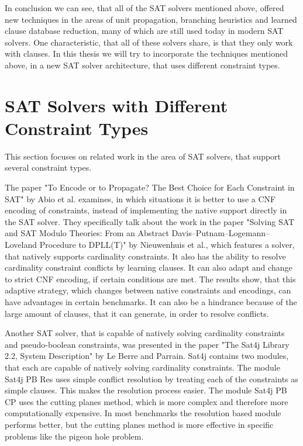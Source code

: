 In conclusion we can see, that all of the SAT solvers mentioned above, offered new techniques in the areas of unit propagation, branching heuristics and learned clause database reduction, many of which are still used today in modern SAT solvers. One characteristic, that all of these solvers share, is that they only work with clauses. In this thesis we will try to incorporate the techniques mentioned above, in a new SAT solver architecture, that uses different constraint types.

\section{SAT Solvers with Different Constraint Types}
This section focuses on related work in the area of SAT solvers, that support several constraint types.

The paper "To Encode or to Propagate? The Best Choice for Each Constraint in SAT" \cite{abio2013encode} by Abio et al. examines, in which situations it is better to use a CNF encoding of constraints, instead of implementing the native support directly in the SAT solver. They specifically talk about the work in the paper "Solving SAT and SAT Modulo Theories: From an Abstract
Davis–Putnam–Logemann–Loveland Procedure to DPLL(T)" \cite{nieuwenhuis2006solving} by Nieuwenhuis et al., which features a solver, that natively supports cardinality constraints. It also has the ability to resolve cardinality constraint conflicts by learning clauses. It can also adapt and change to strict CNF encoding, if certain conditions are met. The results show, that this adaptive strategy, which changes between native constraints and encodings, can have advantages in certain benchmarks. It can also be a hindrance because of the large amount of clauses, that it can generate, in order to resolve conflicts.

Another SAT solver, that is capable of natively solving cardinality constraints and pseudo-boolean constraints, was presented in the paper "The Sat4j Library 2.2, System Description" \cite{le2010sat4j} by Le Berre and Parrain. Sat4j contains two modules, that each are capable of natively solving cardinality constraints. The module Sat4j PB Res uses simple conflict resolution by treating each of the constraints as simple clauses. This makes the resolution process easier. The module Sat4j PB CP uses the cutting planes method, which is more complex and therefore more computationally expensive. In most benchmarks the resolution based module performs better, but the cutting planes method is more effective in specific problems like the pigeon hole problem.

